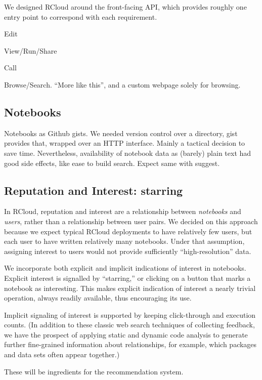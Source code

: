 We designed RCloud around the front-facing API, which provides roughly
one entry point to correspond with each requirement.

Edit

View/Run/Share

Call

Browse/Search. ``More like this'', and a custom webpage solely for browsing.

\subsection{Notebooks\label{sec:notebooks}}

Notebooks as Github gists. 
%
We needed version control over a directory, gist provides that,
wrapped over an HTTP interface.
%
Mainly a tactical decision to save time.
%
Nevertheless, availability of notebook data as (barely) plain text had good side
effects, like ease to build search. 
%
Expect same with suggest.

\subsection{Reputation and Interest: starring\label{sec:starring}}

In RCloud, reputation and interest are a relationship between
\emph{notebooks} and \emph{users}, rather than a relationship between
user pairs. We decided on this approach because we expect typical
RCloud deployments to have relatively few users, but each user to have
written relatively many notebooks. Under that assumption, assigning
interest to users would not provide sufficiently ``high-resolution'' data.

We incorporate both explicit and implicit indications of interest
in notebooks. Explicit interest is signalled by ``starring,'' or
clicking on a button that marks a notebook as interesting. 
This makes explicit indication of interest a nearly trivial operation,
always readily available, thus encouraging its use.

Implicit signaling of interest is supported by keeping click-through
\cite{Joachims:2005:AIC} and execution counts. (In addition to these
classic web search techniques of collecting feedback, we have the
prospect of applying static and dynamic code analysis to generate
further fine-grained information about relationships, for example,
which packages and data sets often appear together.)

 These will be ingredients for the recommendation system.

